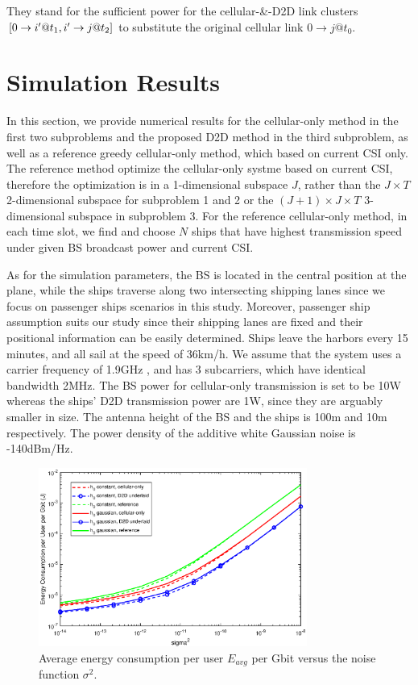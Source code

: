 \documentclass{ieeeaccess}
\begin{document}
They stand for the sufficient power for the  cellular-\&-D2D link clusters $\left[ {{\rm{0}} \to i'@{t_1},i' \to j@{t_2}} \right]$ to substitute the original cellular link $0 \to j @{t_0}$.





\section{Simulation Results}

In this section, we provide numerical results for the cellular-only method in the first two subproblems and the proposed D2D method in the third subproblem, as well as a reference greedy cellular-only method, which based on current CSI only. The reference method optimize the cellular-only systme based on current CSI, therefore the optimization is in a 1-dimensional subspace $J$, rather than the $J \times T$ 2-dimensional subspace for subproblem 1 and 2 or the $\left( {J + 1} \right) \times J \times T$ 3-dimensional subspace in subproblem 3. For the reference cellular-only method, in each time slot, we find and choose $N$ ships that have highest transmission speed under given BS broadcast power and current CSI.

As for the simulation parameters, the BS is located in the central position at the plane, while the ships traverse along two intersecting shipping lanes since we focus on passenger ships scenarios in this study. Moreover, passenger ship assumption suits our study since their shipping lanes are fixed and their positional information can be easily determined. Ships leave the harbors every 15 minutes, and all sail at the speed of 36km/h. We assume that the system uses a carrier frequency of 1.9GHz , and has 3 subcarriers, which have identical bandwidth 2MHz. The BS power for cellular-only transmission is set to be 10W whereas the ships' D2D transmission power are 1W, since they are arguably smaller in size. The antenna height of the BS and the ships is 100m and 10m respectively. The power density of the additive white Gaussian noise is -140dBm/Hz.


\begin{figure} [htb]
\includegraphics*[width=8.8cm]{sigma2s.eps}
\caption{Average energy consumption per user $E_{avg}$ per Gbit versus the noise function ${\sigma ^2}$.}\label{fig:2}
\end{figure}
\end{document}
